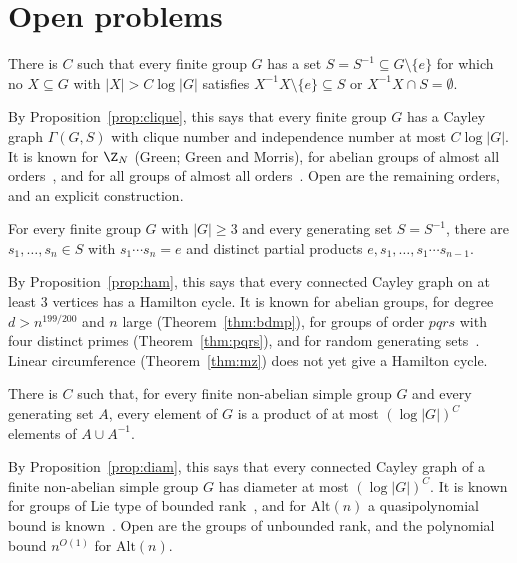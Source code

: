 \section{Open problems}\label{sec:open}

\begin{conjecture}\label{conj:alon-open}
There is $C$ such that every finite group $G$ has a set $S=S^{-1}\subseteq G\setminus\{e\}$ for which no $X\subseteq G$ with $|X|>C\log|G|$ satisfies $X^{-1}X\setminus\{e\}\subseteq S$ or $X^{-1}X\cap S=\emptyset$.
\end{conjecture}

By Proposition~\ref{prop:clique}, this says that every finite group $G$ has a Cayley graph $\Gamma(G,S)$ with clique number and independence number at most $C\log|G|$. It is known for $\Z_N$ (Green; Green and Morris), for abelian groups of almost all orders~\cite{cfpy24}, and for all groups of almost all orders~\cite{sch25}. Open are the remaining orders, and an explicit construction.

\begin{conjecture}[Strasser, 1959]\label{conj:strasser-open}
For every finite group $G$ with $|G|\geq3$ and every generating set $S=S^{-1}$, there are $s_1,\dots,s_n\in S$ with $s_1\cdots s_n=e$ and distinct partial products $e,s_1,\dots,s_1\cdots s_{n-1}$.
\end{conjecture}

By Proposition~\ref{prop:ham}, this says that every connected Cayley graph on at least $3$ vertices has a Hamilton cycle. It is known for abelian groups, for degree $d>n^{199/200}$ and $n$ large (Theorem~\ref{thm:bdmp}), for groups of order $pqrs$ with four distinct primes (Theorem~\ref{thm:pqrs}), and for random generating sets~\cite{dmmps24}. Linear circumference (Theorem~\ref{thm:mz}) does not yet give a Hamilton cycle.

\begin{conjecture}\label{conj:babai-open}
There is $C$ such that, for every finite non-abelian simple group $G$ and every generating set $A$, every element of $G$ is a product of at most $(\log|G|)^C$ elements of $A\cup A^{-1}$.
\end{conjecture}

By Proposition~\ref{prop:diam}, this says that every connected Cayley graph of a finite non-abelian simple group $G$ has diameter at most $(\log|G|)^C$. It is known for groups of Lie type of bounded rank~\cite{ps10,bgt11}, and for $\mathrm{Alt}(n)$ a quasipolynomial bound is known~\cite{hs14}. Open are the groups of unbounded rank, and the polynomial bound $n^{O(1)}$ for $\mathrm{Alt}(n)$.

